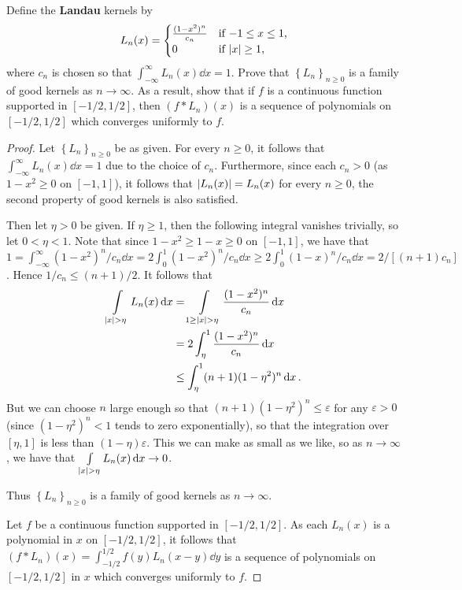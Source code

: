 \documentclass[11pt]{article}
\newcommand{\sbr}[1]{\left[#1\right]}
\newcommand{\cbr}[1]{\left\{#1\right\}}
\begin{document}
Define the \textbf{Landau} kernels by 
\[L_n(x) = \begin{cases}
    \frac{(1-x^2)^n}{c_n} & \text{if $-1\leq x\leq 1$,}\\
    0 & \text{if $\abs{x}\geq 1$,}
\end{cases}\]
where $c_n$ is chosen so that $\int_{-\infty}^{\infty} L_n(x)\dd{x} = 1$. Prove that $\cbr{L_n}_{n\geq 0}$ is a family of good kernels as $n\to \infty$. As a result, show that if $f$ is a continuous function supported in $\sbr{-1/2, 1/2}$, then $(f\ast L_n)(x)$ is a sequence of polynomials on $\sbr{-1/2, 1/2}$ which converges uniformly to $f$.

\begin{proof}
    Let $\cbr{L_n}_{n\geq 0}$ be as given. For every $n\geq 0$, it follows that $\int_{-\infty}^{\infty} L_n(x)\dd{x} = 1$ due to the choice of $c_n$. Furthermore, since each $c_n > 0$ (as $1-x^2 \geq 0$ on $[-1,1]$), it follows that $\abs{L_n(x)} = L_n(x)$ for every $n\geq 0$, the second property of good kernels is also satisfied.

    Then let $\eta>0$ be given. If $\eta \geq 1$, then the following integral vanishes trivially, so let $0 <\eta < 1$. 
    Note that since $1-x^2 \geq 1-x \geq 0 $ on $[-1,1]$, we have that $1 = \int_{-\infty}^{\infty} (1-x^2)^n/c_n\dd{x} = 2\int_0^1 (1-x^2)^n/c_n \dd{x} \geq 2\int_0^1 (1-x)^n/c_n\dd{x} = 2/[(n+1)c_n]$. Hence $1/c_n \leq (n+1)/2$.
    It follows that \begin{align*}
        \int\limits_{\abs{x}> \eta} L_n(x)\dd{x} &= \int\limits_{1 \geq \abs{x}> \eta}\frac{(1-x^2)^n}{c_n} \dd{x}\\
        &= 2\int_\eta^1 \frac{(1-x^2)^n}{c_n}\dd{x}\\
        &\leq \int_\eta^1 (n+1)(1-\eta^2)^n\dd{x}.
    \end{align*}
    But we can choose $n$ large enough so that $(n+1)(1-\eta^2)^n \leq \varepsilon$ for any $\varepsilon> 0$ (since $(1-\eta^2)^n < 1 $ tends to zero exponentially), so that the integration over $[\eta, 1]$ is less than $(1-\eta)\varepsilon$. This we can make as small as we like, so as $n\to \infty$, we have that $\int\limits_{\abs{x}> \eta} L_n(x)\dd{x}\to 0$.

    Thus $\cbr{L_n}_{n\geq 0}$ is a family of good kernels as $n\to \infty$.

    Let $f$ be a continuous function supported in $\sbr{-1/2, 1/2}$. As each $L_n(x)$ is a polynomial in $x$ on $\sbr{-1/2, 1/2}$, it follows that $(f\ast L_n)(x) = \int_{-1/2}^{1/2} f(y)L_n(x-y)\dd{y}$ is a sequence of polynomials on $\sbr{-1/2, 1/2}$ in $x$ which converges uniformly to $f$. 
\end{proof}
\end{document}
